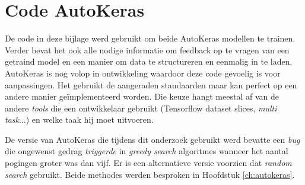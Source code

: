 \chapter{Code AutoKeras}
\label{ch:app:autokeras}

De code in deze bijlage werd gebruikt om beide AutoKeras modellen te trainen. Verder bevat het ook alle nodige informatie om feedback op te vragen van een getraind model en een manier om data te structureren en eenmalig in te laden. AutoKeras is nog volop in ontwikkeling waardoor deze code gevoelig is voor aanpassingen. Het gebruikt de aangeraden standaarden maar kan perfect op een andere manier geïmplementeerd worden. Die keuze hangt meestal af van de andere \textit{tools} die een ontwikkelaar gebruikt (Tensorflow dataset slices, \textit{multi task}...) en welke taak hij moet uitvoeren.

De versie van AutoKeras die tijdens dit onderzoek gebruikt werd bevatte een \textit{bug} die ongewenst gedrag \textit{triggerde} in \textit{greedy search} algoritmes wanneer het aantal pogingen groter was dan vijf. Er is een alternatieve versie voorzien dat \textit{random search} gebruikt. Beide methodes werden besproken in Hoofdstuk \ref{ch:autokeras}.


